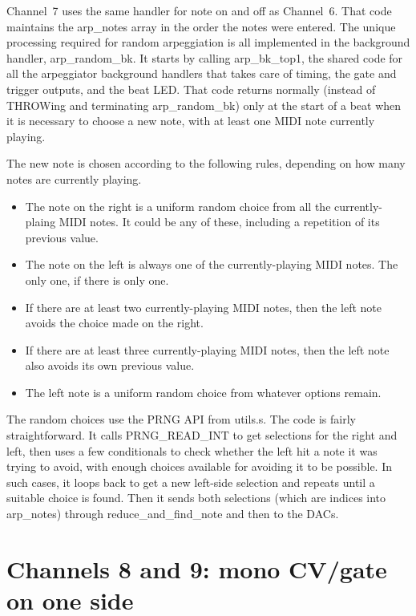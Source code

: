 Channel~7 uses the same handler for note on and off as Channel~6.  That
code maintains the arp\_notes array in the order the notes were entered. 
The unique processing required for random arpeggiation is all implemented in
the background handler, arp\_random\_bk.  It starts by calling
arp\_bk\_top1, the shared code for all the arpeggiator background handlers
that takes care of timing, the gate and trigger outputs, and the beat LED. 
That code returns normally (instead of THROWing and terminating
arp\_random\_bk) only at the start of a beat when it is necessary to choose
a new note, with at least one MIDI note currently playing.

The new note is chosen according to the following rules, depending on how
many notes are currently playing.
\begin{itemize}
  \item The note on the right is a uniform random choice from all
    the currently-plaing MIDI notes.  It could be any of these, including a
    repetition of its previous value.
  \item The note on the left is always one of the currently-playing MIDI
    notes.  The only one, if there is only one.
  \item If there are at least two currently-playing MIDI notes, then the
    left note avoids the choice made on the right.
  \item If there are at least three currently-playing MIDI notes, then the
    left note also avoids its own previous value.
  \item The left note is a uniform random choice from whatever options
    remain.
\end{itemize}

The random choices use the PRNG API from utils.s.  The code is fairly
straightforward.  It calls PRNG\_READ\_INT to get selections for the right
and left, then uses a few conditionals to check whether the left hit a note
it was trying to avoid, with enough choices available for avoiding it to be
possible.  In such cases, it loops back to get a new left-side selection and
repeats until a suitable choice is found.  Then it sends both selections
(which are indices into arp\_notes) through reduce\_and\_find\_note and then
to the DACs.

\section{Channels 8 and 9:  mono CV/gate on one side}

